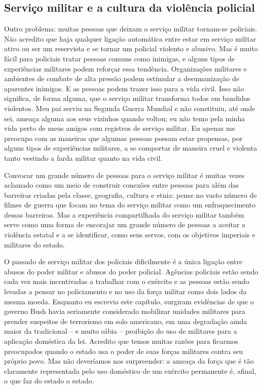 \subsection*{Serviço militar e a cultura da violência policial}

Outro problema: muitas pessoas que deixam o serviço militar tornam-se policiais. Não acredito que haja qualquer ligação automática entre estar em serviço militar ativo ou ser um reservista e se tornar um policial violento e abusivo. Mas é muito fácil para policiais tratar pessoas comuns como inimigas, e alguns tipos de experiências militares podem reforçar essa tendência. Organizações militares e ambientes de combate de alta pressão podem estimular a desumanização de aparentes inimigos. E as pessoas podem trazer isso para a vida civil. Isso não significa, de forma alguma, que o serviço militar transforma todos em bandidos violentos. Meu pai serviu na Segunda Guerra Mundial e não constituiu, até onde sei, ameaça alguma aos seus vizinhos quando voltou; eu não temo pela minha vida perto de meus amigos com registros de serviço militar. Eu apenas me preocupo com as maneiras que algumas pessoas possam estar propensas, por alguns tipos de experiências militares, a se comportar de maneira cruel e violenta tanto vestindo a farda militar quanto na vida civil.

Convocar um grande número de pessoas para o serviço militar é muitas vezes aclamado como um meio de construir conexões entre pessoas para além das barreiras criadas pela classe, geografia, cultura e etnia: pense no vasto número de filmes de guerra que focam no tema do serviço militar como um enfraquecimento dessas barreiras. Mas a experiência compartilhada do serviço militar também serve como uma forma de encorajar um grande número de pessoas a aceitar a violência estatal e a se identificar, como seus servos, com os objetivos imperiais e militares do estado.

O passado de serviço militar dos policiais dificilmente é a única ligação entre abusos do poder militar e abusos do poder policial. Agências policiais estão sendo cada vez mais incentivadas a trabalhar com o exército e as pessoas estão sendo levadas a pensar no policiamento e no uso da força militar como dois lados da mesma moeda. Enquanto eu escrevia este capítulo, surgiram evidências de que o governo Bush havia seriamente considerado mobilizar unidades militares para prender suspeitos de terrorismo em solo americano, em uma degradação ainda maior da tradicional -- e muito sábia -- proibição do uso de militares para a aplicação doméstica da lei. Acredito que temos muitas razões para ficarmos preocupados quando o estado usa o poder de suas forças militares contra seu próprio povo. Mas não deveríamos nos surpreender: a ameaça da força que é tão claramente representada pelo uso doméstico de um exército permanente é, afinal, o que faz do estado o estado.

